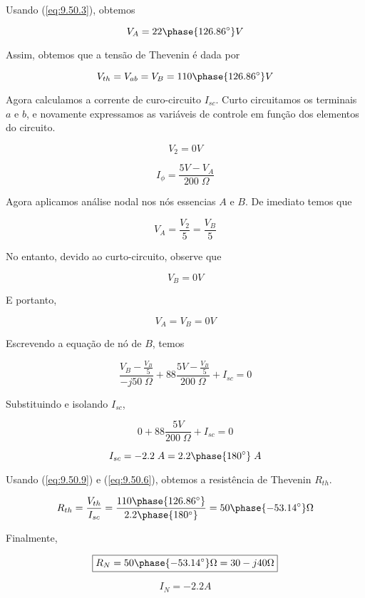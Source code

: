 Usando (\ref{eq:9.50.3}), obtemos

\begin{equation}\label{eq:9.50.5}
    V_{A} = 22\phase{126.86^{\circ}} V
\end{equation}

Assim, obtemos que a tensão de Thevenin é dada por

\begin{equation}\label{eq:9.50.6}
    V_{th} = V_{ab} = V_B = 110\phase{126.86^{\circ}} V
\end{equation}

Agora calculamos a corrente de curo-circuito \( I_{sc}\). 
Curto circuitamos os terminais \( a \) e \( b \), e novamente expressamos as variáveis de controle em função dos elementos
do circuito.

\begin{equation}\label{eq:9.50.7}
    V_{2} = 0 V
\end{equation}

\begin{equation}\label{eq:9.50.8}
    I_{\phi} = \frac{5V - V_A}{200 \;\Omega}
\end{equation}

Agora aplicamos análise nodal nos nós essencias \(A\) e \( B \).
De imediato temos que

\[ V_{A} = \frac{V_2}{5} = \frac{V_B}{5} \]

No entanto, devido ao curto-circuito, observe que 

\[ V_B = 0V \]

E portanto,

\[ V_A = V_B = 0V \]

Escrevendo a equação de nó de \(B\), temos

\[ \frac{V_B - \frac{V_B}{5}}{-j50 \;\Omega} + 88\frac{5V - \frac{V_B}{5}}{200 \;\Omega} + I_{sc} = 0 \]

Substituindo e isolando  \(I_{sc}\),

\[ 0 + 88\frac{5V}{200 \;\Omega} + I_{sc} = 0 \]

\begin{equation}\label{eq:9.50.9}
    I_{sc} = - 2.2 \; A = 2.2\phase{180^{\circ}} \; A
\end{equation}

Usando (\ref{eq:9.50.9}) e (\ref{eq:9.50.6}), obtemos a resistência de Thevenin \( R_{th} \).

\begin{equation}\label{eq:9.50.10}
    R_{th} = \frac{V_{th}}{I_{sc}} = \frac{110\phase{126.86^{\circ}}}{2.2\phase{180^{\circ}}} = 50\phase{-53.14^{\circ}} \Omega
\end{equation}

Finalmente,

\[ \boxed{R_{N} = 50\phase{-53.14^{\circ}} \Omega = 30 - j40 \Omega}  \]

\[ \boxed{I_{N} = - 2.2 A}  \]








